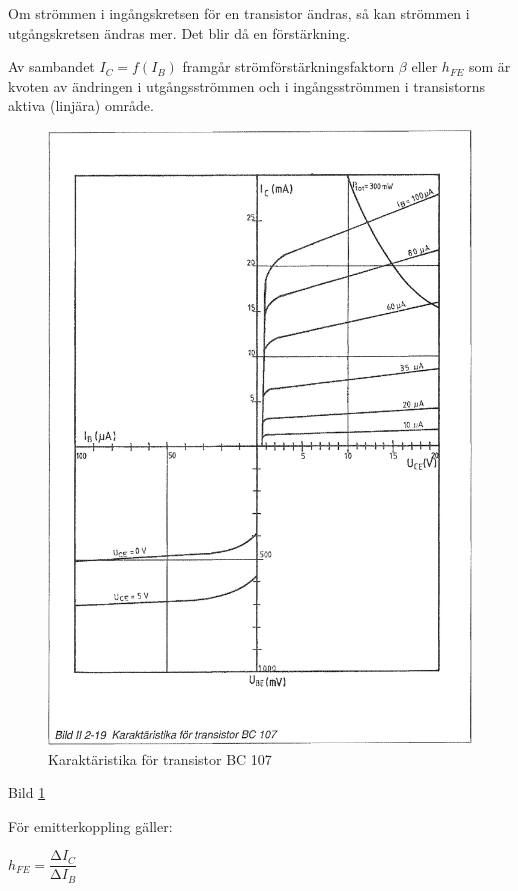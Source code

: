 Om strömmen i ingångskretsen för en transistor ändras, så kan strömmen i
utgångskretsen ändras mer. Det blir då en förstärkning.

Av sambandet \(I_C = f(I_B)\) framgår strömförstärkningsfaktorn \(\beta\) eller
\(h_{FE}\) som är kvoten av ändringen i utgångsströmmen och i ingångsströmmen i
transistorns aktiva (linjära) område.

\begin{figure}
\includegraphics[width=\textwidth]{images/bild_2_2-19}
\caption{Karaktäristika för transistor BC 107}
\label{fig:BildII2-19}
\end{figure}

Bild \ref{fig:BildII2-19}

För emitterkoppling gäller:

\(h_{FE} = \dfrac{∆I_C}{∆I_B}\)

